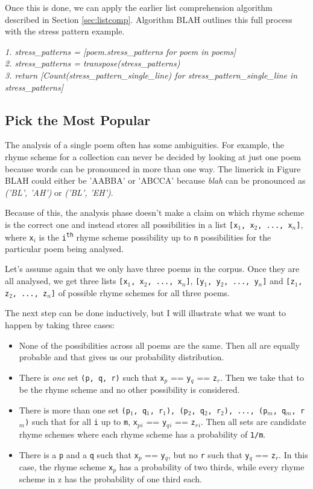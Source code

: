 Once this is done, we can apply the earlier list comprehension algorithm described in Section \ref{sec:listcomp}. Algorithm BLAH outlines this full process with the stress pattern example.

\textit{
1. stress\_patterns = [poem.stress\_patterns for poem in poems]\\
2. stress\_patterns = transpose(stress\_patterns)\\
3. return [Count(stress\_pattern\_single\_line) for stress\_pattern\_single\_line in stress\_patterns]\\
}

\subsection{Pick the Most Popular}

The analysis of a single poem often has some ambiguities. For example, the rhyme scheme for a collection can never be decided by looking at just one poem because words can be pronounced in more than one way. The limerick in Figure BLAH could either be 'AABBA' or 'ABCCA' because \textit{blah} can be pronounced as \textit{('BL', 'AH')} or \textit{('BL', 'EH')}.

Because of this, the analysis phase doesn't make a claim on which rhyme scheme is the correct one and instead stores all possibilities in a list \texttt{[x$_1$, x$_2$, ..., x$_n$]}, where \texttt{x$_i$} is the \texttt{i\textsuperscript{th}} rhyme scheme possibility up to \texttt{n} possibilities for the particular poem being analysed.

Let's assume again that we only have three poems in the corpus. Once they are all analysed, we get three lists \texttt{[x$_1$, x$_2$, ..., x$_n$]}, \texttt{[y$_1$, y$_2$, ..., y$_n$]} and \texttt{[z$_1$, z$_2$, ..., z$_n$]} of possible rhyme schemes for all three poems.

The next step can be done inductively, but I will illustrate what we want to happen by taking three cases:
\begin{itemize}
\item{None of the possibilities across all poems are the same. Then all are equally probable and that gives us our probability distribution.}
\item{There is \textit{one} set \texttt{(p, q, r)} such that \texttt{x$_p$} == \texttt{y$_q$} == \texttt{z$_r$}. Then we take that to be the rhyme scheme and no other possibility is considered.}
\item{There is more than one set \texttt{(p$_1$, q$_1$, r$_1$), (p$_2$, q$_2$, r$_2$), ..., (p$_m$, q$_m$, r$_m$)} such that for all \texttt{i} up to \texttt{m}, \texttt{x$_p{_i}$} == \texttt{y$_q{_i}$} == \texttt{z$_r{_i}$}. Then all sets are candidate rhyme schemes where each rhyme scheme has a probability of \texttt{1/m}.}
\item{There is a \texttt{p} and a \texttt{q} such that \texttt{x$_p$} == \texttt{y$_q$}, but no \texttt{r} such that \texttt{y$_q$} == \texttt{z$_r$}. In this case, the rhyme scheme \texttt{x$_p$} has a probability of two thirds, while every rhyme scheme in z has the probability of one third each.}
\end{itemize}

